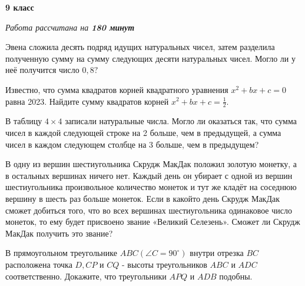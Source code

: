 \centerline{\bf \huge 9 класс}
\centerline{\normalsize{\it Работа рассчитана на \bf{180} минут}}

Эвена сложила десять подряд идущих натуральных чисел, затем разделила полученную сумму на сумму следующих десяти натуральных чисел. Могло ли у неё получится число $0,8 ?$


Известно, что сумма квадратов корней квадратного уравнения $x^2+b x+ c=0$ равна 2023. Найдите сумму квадратов корней $x^2+b x+c=\frac{1}{2}$.


В таблицу $4 \times 4$ записали натуральные числа. Могло ли оказаться так, что сумма чисел в каждой следующей строке на 2 больше, чем в предыдущей, а сумма чисел в каждом следующем столбце на 3 больше, чем в предыдущем?

В одну из вершин шестиугольника Скрудж МакДак положил золотую монетку, а в остальных вершинах ничего нет. Каждый день он убирает с одной из вершин шестиугольника произвольное количество монеток и тут же кладёт на соседнюю вершину в шесть раз больше монеток. Если в какойто день Скрудж МакДак сможет добиться того, что во всех вершинах шестиугольника одинаковое число монеток, то ему будет присвоено звание «Великий Селезень». Сможет ли Скрудж МакДак получить это звание?

В прямоугольном треугольнике $A B C\left(\angle C=90^{\circ}\right)$ внутри отрезка $B C$ расположена точка $D, C P$ и $C Q$ - высоты треугольников $A B C$ и $A D C$ соответственно. Докажите, что треугольники $A P Q$ и $A D B$ подобны.
